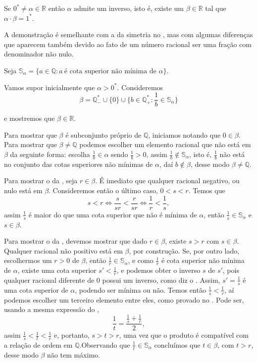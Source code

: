 \documentclass[../main.tex]{subfiles}
\begin{document}
\begin{teo}\label{reais-teo-simetricoProduto}
    Se $0^* \neq \alpha \in \mathbb{R}$ então $\alpha$ admite um inverso, isto é, existe um $\beta \in \mathbb{R}$ tal que $\alpha \cdot \beta = 1^*$.
\end{teo}
\begin{dem}
    A demonstração é semelhante com a da simetria no , mas com algumas diferenças que aparecem também devido ao fato de um número racional ser uma fração com denominador não nulo.

    Seja $\mathbb{S}_{\alpha} = \{a \in \mathbb{Q} : a\ \text{é cota superior não mínima de }\alpha \}$.

    Vamos supor inicialmente que $\alpha > 0^*$. Consideremos 
    \[ \beta = \mathbb{Q}_{-}^* \cup \{ 0 \} \cup 
    \{ b \in \mathbb{Q}_{+}^* : \frac{1}{b} \in \mathbb{S}_{\alpha} \} \] 

    \noindent e mostremos que $\beta \in \mathbb{R}$.
    
    Para mostrar que $\beta$ é subconjunto próprio de $\mathbb{Q}$, iniciamos notando que $0 \in \beta$. Para mostrar que $\beta \neq \mathbb{Q}$ podemos escolher um elemento racional que não está em $\beta$ da seguinte forma: escolha $\frac{1}{b} \in \alpha$ sendo $\frac{1}{b} > 0$, assim $\frac{1}{b} \not\in \mathbb{S}_{\alpha}$, isto é, $\frac{1}{b}$ não está no conjunto das cotas superiores não mínimas de $\alpha$, daí $b \not\in \beta$, desse modo $\beta \neq \mathbb{Q}$.
    
    Para mostrar o  da , seja $r \in \beta$. É imediato que qualquer racional negativo, ou nulo está em $\beta$. Consideremos então o último caso, $0 < s < r$. Temos que 
    \[ s < r \iff \frac{s}{sr} < \frac{r}{sr} \iff \frac{1}{r} < \frac{1}{s}, \] 
    assim $\frac{1}{s}$ é maior do que uma cota superior que não é mínima de $\alpha$, então $\frac{1}{s} \in \mathbb{S}_{\alpha}$ e $s \in \beta$.

    Para mostrar o  da , devemos mostrar que dado $r \in \beta$, existe $s>r$ com $s \in \beta$. Qualquer racional não positivo está em $\beta$, por construção. Se, por outro lado, escolhermos um $r > 0$ de $\beta$, então $\frac{1}{r} \in \mathbb{S}_{\alpha}$, e como $\frac{1}{r}$ é cota superior não mínima de $\alpha$, existe uma cota superior $s' < \frac{1}{r}$, e podemos obter o inverso $s$ de $s'$, pois qualquer racional diferente de $0$ possui um inverso, como diz o . Assim, $s' = \frac{1}{s}$ é uma cota superior de $\alpha$, podendo ser mínima ou não. Temos então $\frac{1}{s} < \frac{1}{r}$, aí podemos escolher um terceiro elemento entre eles, como provado no . Pode ser, usando a mesma expressão do ,
    \[ \dfrac{1}{t} = \dfrac{\frac{1}{s} + \frac{1}{r}}{2}, \]
    assim $\frac{1}{s} < \frac{1}{t} < \frac{1}{r}$ e, portanto, $s > t > r$, uma vez que o produto é compatível com a relação de ordem em $\mathbb{Q}$.Observando que $\frac{1}{t} \in \mathbb{S}_{\alpha}$ concluímos que $t \in \beta$, com $t>r$, desse modo $\beta$ não tem máximo. 


\end{dem}
\end{document}
